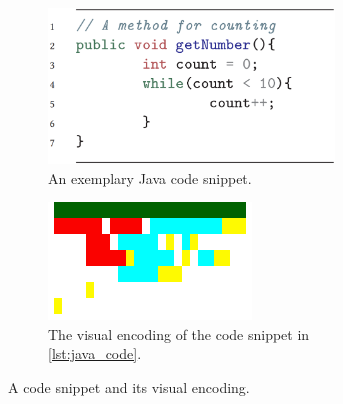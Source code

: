 \documentclass[%
class=scrreprt,
chapterprefix=false,%
open=right,%
twoside=false,%
paper=a4,%
logofile={Logo\_zentral\_farbig\_EN.png},%
thesistype=master,%
UKenglish,%
]{se2thesis}
\theoremstyle{definition}
\begin{document}
%	
	
	\begin{figure}
		\begin{subfigure}{0.48\textwidth}
			\centering
			\includegraphics[width=\textwidth, height=117pt]{img/visual_encoding_code.png}
			\caption{An exemplary Java code snippet.}
			\label{lst:java_code}
		\end{subfigure}
		\begin{subfigure}[b]{0.48\textwidth}
			\centering
			\includegraphics[width=\textwidth]{img/visual_encoding.png}
			\caption{The visual encoding of the code snippet in \autoref{lst:java_code}.}
			\label{fig:visual_encoding}
		\end{subfigure}
		\caption{A code snippet and its visual encoding.}
		\label{fig:visual_encoding_combined}
	\end{figure}
\end{document}
